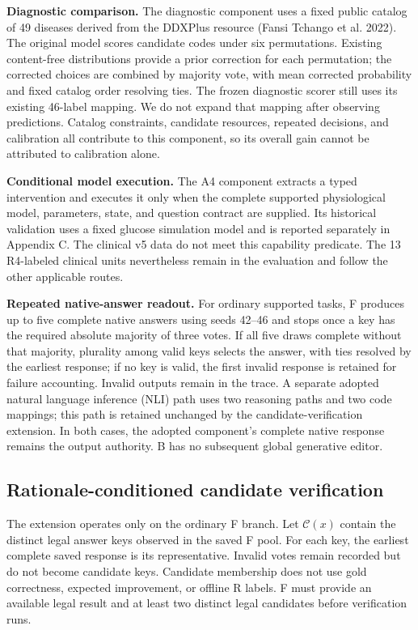 \documentclass[
  english,
  11pt,
]{article}
\begin{document}
\textbf{Diagnostic comparison.} The diagnostic component uses a fixed
public catalog of 49 diseases derived from the DDXPlus resource (Fansi
Tchango et al. 2022). The original model scores candidate codes under
six permutations. Existing content-free distributions provide a prior
correction for each permutation; the corrected choices are combined by
majority vote, with mean corrected probability and fixed catalog order
resolving ties. The frozen diagnostic scorer still uses its existing
46-label mapping. We do not expand that mapping after observing
predictions. Catalog constraints, candidate resources, repeated
decisions, and calibration all contribute to this component, so its
overall gain cannot be attributed to calibration alone.

\textbf{Conditional model execution.} The A4 component extracts a typed
intervention and executes it only when the complete supported
physiological model, parameters, state, and question contract are
supplied. Its historical validation uses a fixed glucose simulation
model and is reported separately in Appendix C. The clinical v5 data do
not meet this capability predicate. The 13 R4-labeled clinical units
nevertheless remain in the evaluation and follow the other applicable
routes.

\textbf{Repeated native-answer readout.} For ordinary supported tasks, F
produces up to five complete native answers using seeds 42--46 and stops
once a key has the required absolute majority of three votes. If all
five draws complete without that majority, plurality among valid keys
selects the answer, with ties resolved by the earliest response; if no
key is valid, the first invalid response is retained for failure
accounting. Invalid outputs remain in the trace. A separate adopted
natural language inference (NLI) path uses two reasoning paths and two
code mappings; this path is retained unchanged by the
candidate-verification extension. In both cases, the adopted component's
complete native response remains the output authority. B has no
subsequent global generative editor.

\subsection{Rationale-conditioned candidate
verification}\label{rationale-conditioned-candidate-verification}

The extension operates only on the ordinary F branch. Let
\(\mathcal{C}(x)\) contain the distinct legal answer keys observed in
the saved F pool. For each key, the earliest complete saved response is
its representative. Invalid votes remain recorded but do not become
candidate keys. Candidate membership does not use gold correctness,
expected improvement, or offline R labels. F must provide an available
legal result and at least two distinct legal candidates before
verification runs.
\end{document}
